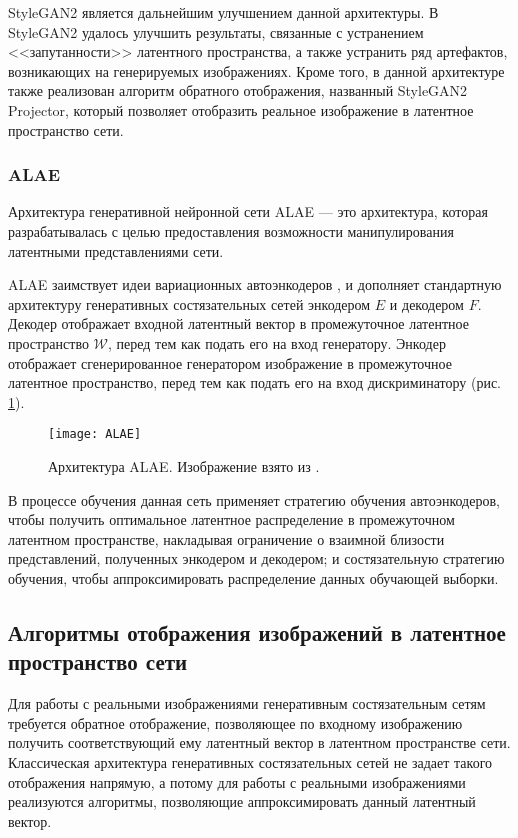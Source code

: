 StyleGAN2 \cite{karras2020stylegan2} является дальнейшим улучшением данной архитектуры.
В StyleGAN2 удалось улучшить результаты, связанные с устранением <<запутанности>> латентного пространства, а также устранить ряд артефактов, возникающих на генерируемых изображениях.
Кроме того, в данной архитектуре также реализован алгоритм обратного отображения, названный StyleGAN2 Projector, который позволяет отобразить реальное изображение в латентное пространство сети.

\subsubsection{ALAE}
Архитектура генеративной нейронной сети ALAE \cite{ALAE} –-- это архитектура, которая разрабатывалась с целью предоставления возможности манипулирования латентными представлениями сети.

ALAE заимствует идеи вариационных автоэнкодеров \cite{kingma2014vae}, и дополняет стандартную архитектуру генеративных состязательных сетей энкодером $E$ и декодером $F$.
Декодер отображает входной латентный вектор в промежуточное латентное пространство $\mathcal W$, перед тем как подать его на вход генератору.
Энкодер отображает сгенерированное генератором изображение в промежуточное латентное пространство, перед тем как подать его на вход дискриминатору (рис. \ref{fig:alae}).

\begin{figure}[h]
\begin{center}
    \texttt{[image: ALAE]}
    \caption{Архитектура ALAE. Изображение взято из \cite{ALAE}.}
    \label{fig:alae}
\end{center}
\end{figure}

В процессе обучения данная сеть применяет стратегию обучения автоэнкодеров, чтобы получить оптимальное латентное распределение в промежуточном латентном пространстве, накладывая ограничение о взаимной близости представлений, полученных энкодером и декодером;
и состязательную стратегию обучения, чтобы аппроксимировать распределение данных обучающей выборки.


\subsection{Алгоритмы отображения изображений в латентное пространство сети}

Для работы с реальными изображениями генеративным состязательным сетям требуется обратное отображение, позволяющее по входному изображению получить соответствующий ему латентный вектор в латентном пространстве сети. 
Классическая архитектура генеративных состязательных сетей не задает такого отображения напрямую, а потому для работы с реальными изображениями реализуются алгоритмы, позволяющие аппроксимировать данный латентный вектор.

